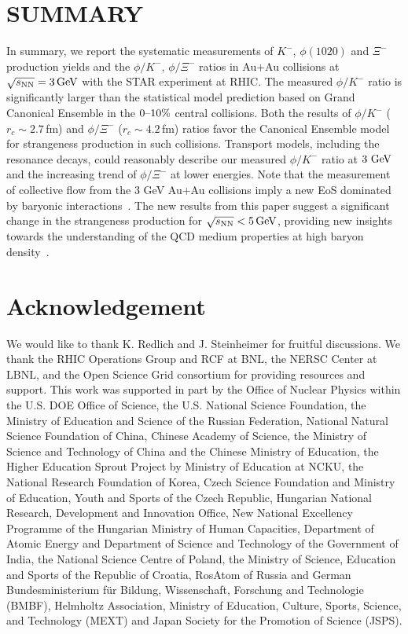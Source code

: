 \documentclass[aps,tightenlines,superscriptaddress,twocolumn]{revtex4-1}
\begin{document}
\section{SUMMARY}
\label{summary}

In summary, we report the systematic measurements of $K^-$, $\phi(1020)$ and $\Xi^{-}$ production yields and the $\phi/K^-$, $\phi/\Xi^-$ ratios in Au+Au collisions at ${\sqrt{s_{\rm NN}} = \rm{3\,GeV}}$ with the STAR experiment at RHIC. The measured $\phi/K^-$ ratio is significantly larger than the statistical model prediction based on Grand Canonical Ensemble in the $\textup{0--10\%}$ central collisions. Both the results of $\phi/K^-$ ($r_c \sim 2.7$\,fm) and $\phi/\Xi^-$ ($r_c \sim 4.2$\,fm) ratios favor the Canonical Ensemble model for strangeness production in such collisions. Transport models, including the resonance decays, could reasonably describe our measured $\phi/K^-$ ratio at $\textup{3 GeV}$ and the increasing trend of $\phi/\Xi^-$ at lower energies. 
Note that the measurement of collective flow from the 3 GeV Au+Au collisions imply a new EoS dominated by baryonic interactions~\cite{STAR:2021yiu}. The new results from this paper suggest a significant change in the strangeness production for ${\sqrt{s_{\rm NN}} < \rm{5\,GeV}}$, providing new insights towards the understanding of the QCD medium properties at high baryon density~\cite{KO_sQM2017}. 


\section{Acknowledgement}
\label{acknowledgement}

We would like to thank K. Redlich and J. Steinheimer for fruitful discussions.
We thank the RHIC Operations Group and RCF at BNL, the NERSC Center at LBNL, and the Open Science Grid consortium for providing resources and support.  This work was supported in part by the Office of Nuclear Physics within the U.S. DOE Office of Science, the U.S. National Science Foundation, the Ministry of Education and Science of the Russian Federation, National Natural Science Foundation of China, Chinese Academy of Science, the Ministry of Science and Technology of China and the Chinese Ministry of Education, the Higher Education Sprout Project by Ministry of Education at NCKU, the National Research Foundation of Korea, Czech Science Foundation and Ministry of Education, Youth and Sports of the Czech Republic, Hungarian National Research, Development and Innovation Office, New National Excellency Programme of the Hungarian Ministry of Human Capacities, Department of Atomic Energy and Department of Science and Technology of the Government of India, the National Science Centre of Poland, the Ministry  of Science, Education and Sports of the Republic of Croatia, RosAtom of Russia and German Bundesministerium f\"ur Bildung, Wissenschaft, Forschung and Technologie (BMBF), Helmholtz Association, Ministry of Education, Culture, Sports, Science, and Technology (MEXT) and Japan Society for the Promotion of Science (JSPS).


\end{document}
